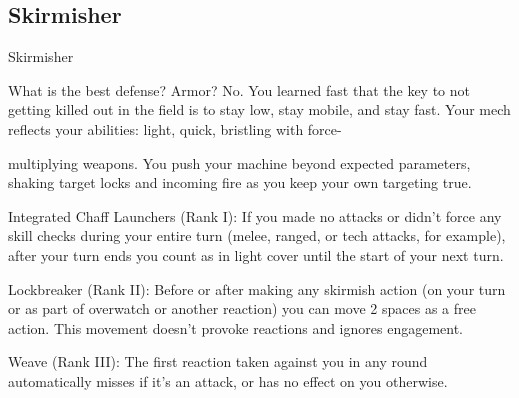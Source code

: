\subsection{Skirmisher}

                                                   Skirmisher  

What is the best defense? Armor? No. You learned fast that the key to not getting killed out in the field is to  
stay low, stay mobile, and stay fast. Your mech reflects your abilities: light, quick, bristling with force- 

multiplying weapons. You push your machine beyond expected parameters, shaking target locks and  
incoming fire as you keep your own targeting true.   

Integrated Chaff Launchers (Rank I): If you made no attacks or didn’t force any skill checks  
during your entire turn (melee, ranged, or tech attacks, for example), after your turn ends you  
count as in light cover until the start of your next turn.
 
Lockbreaker (Rank II): Before or after making any skirmish action (on your turn or as part of  
overwatch or another reaction) you can move 2 spaces as a free action. This movement doesn’t  
provoke reactions and ignores engagement.
 
Weave (Rank III): The first reaction taken against you in any round automatically misses if it’s an  
attack, or has no effect on you otherwise.